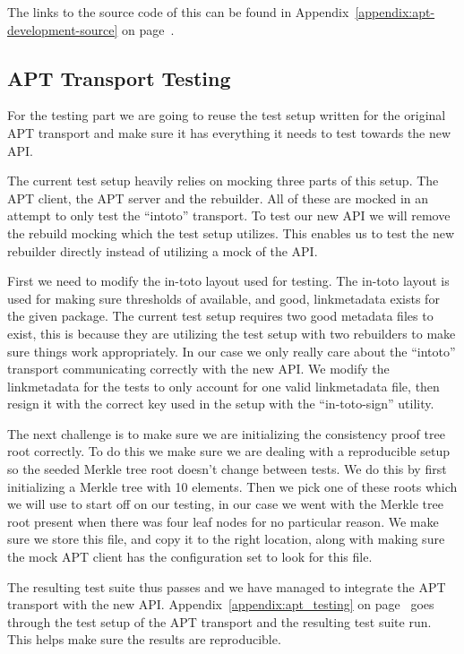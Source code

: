 \documentclass[../Main/thesis.tex]{subfiles}
\begin{document}
The links to the source code of this can be found in
Appendix~\ref{appendix:apt-development-source} on
page~\pageref{appendix:apt-development-source}.

\subsection*{APT Transport Testing}%
\label{sub:apt_transport_testing}
For the testing part we are going to reuse the test setup written for the
original APT transport and make sure it has everything it needs to test towards
the new API.

The current test setup heavily relies on mocking three parts of this setup. The
APT client, the APT server and the rebuilder. All of these are mocked in an
attempt to only test the ``intoto'' transport. To test our new API we will
remove the rebuild mocking which the test setup utilizes. This enables us to
test the new rebuilder directly instead of utilizing a mock of the API.

First we need to modify the in-toto layout used for testing. The in-toto layout
is used for making sure thresholds of available, and good, linkmetadata exists for
the given package. The current test setup requires two good metadata files to
exist, this is because they are utilizing the test setup with two rebuilders to
make sure things work appropriately. In our case we only really care about the
``intoto'' transport communicating correctly with the new API. We modify the
linkmetadata for the tests to only account for one valid linkmetadata file, then
resign it with the correct key used in the setup with the ``in-toto-sign''
utility.

The next challenge is to make sure we are initializing the consistency proof
tree root correctly. To do this we make sure we are dealing with a reproducible
setup so the seeded Merkle tree root doesn't change between tests. We do this by
first initializing a Merkle tree with 10 elements. Then we pick one of these
roots which we will use to start off on our testing, in our case we went with
the Merkle tree root present when there was four leaf nodes for no particular
reason. We make sure we store this file, and copy it to the right location,
along with making sure the mock APT client has the configuration set to look for
this file.

The resulting test suite thus passes and we have managed to integrate the APT
transport with the new API. Appendix~\ref{appendix:apt_testing} on
page~\pageref{appendix:apt_testing} goes through the test setup of the APT 
transport and the resulting test suite run. This helps make sure the results are
reproducible.
\end{document}
